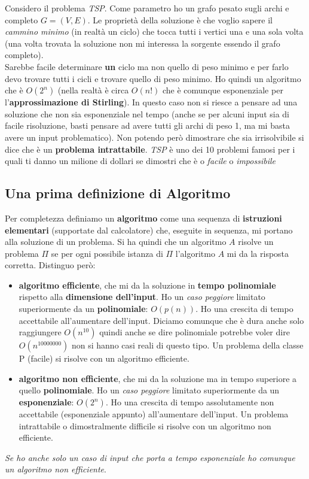 \begin{esempio}
	Considero il problema \emph{TSP}. Come parametro ho un grafo pesato sugli
	archi e completo $G=(V,E)$. Le proprietà della soluzione è che voglio sapere
	il \emph{cammino minimo} (in realtà un ciclo) che tocca tutti i vertici una e
	una sola volta (una volta trovata la soluzione non mi interessa la sorgente
	essendo il grafo completo). \\
	Sarebbe facile determinare \textbf{un} ciclo ma non quello di peso minimo e
	per farlo devo trovare tutti i cicli e trovare quello di peso minimo. Ho
	quindi un algoritmo che è $O(2^n)$ (nella realtà è circa $O(n!)$ che è
	comunque esponenziale per l'\textbf{approssimazione di Stirling}). In questo
	caso non si riesce a pensare ad una soluzione che non sia esponenziale nel
	tempo (anche se per alcuni input sia di facile risoluzione, basti pensare ad
	avere tutti gli archi di peso 1, ma mi basta avere un input problematico). Non
	potendo però dimostrare che sia irrisolvibile si dice che è un
	\textbf{problema intrattabile}. \textit{TSP} è uno dei 10 problemi famosi per
	i quali ti danno un milione di dollari se dimostri che è o \emph{facile} o
	\emph{impossibile}
\end{esempio}

\subsection{Una prima definizione di Algoritmo}
Per completezza definiamo un \textbf{algoritmo} come una sequenza di
\textbf{istruzioni elementari} (supportate dal calcolatore) che, eseguite in
sequenza, mi portano alla soluzione di un problema. Si ha quindi che un
algoritmo $A$ risolve un problema $\Pi$ se per ogni possibile istanza di $\Pi$
l'algoritmo $A$ mi da la risposta corretta. Distinguo però:
\begin{itemize}
	\item \textbf{algoritmo efficiente}, che mi da la soluzione in \textbf{tempo
	      polinomiale} rispetto alla \textbf{dimensione dell'input}. Ho un
	\textit{caso peggiore} limitato superiormente da un \textbf{polinomiale}:
	$O(p(n))$. Ho una crescita di tempo accettabile all'aumentare
	dell'input. Diciamo comunque che è dura anche solo raggiungere $O(n^{10})$
	quindi anche se dire polinomiale potrebbe voler dire $O(n^{10000000})$ non si
	hanno casi reali di questo tipo. Un problema della classe P (facile) si risolve con un algoritmo efficiente.
		  
	\item \textbf{algoritmo non efficiente}, che mi da la soluzione ma in tempo
	      superiore a quello \textbf{polinomiale}. Ho un \textit{caso peggiore} limitato
	      superiormente da un \textbf{esponenziale}: $O(2^n)$. Ho una crescita di tempo
	      assolutamente non accettabile (esponenziale appunto) all'aumentare dell'input. Un problema intrattabile o dimostralmente difficile si risolve con un algoritmo non efficiente.
\end{itemize}
\textit{Se ho anche solo un caso di input che porta a tempo esponenziale ho
	comunque un algoritmo non efficiente}.\\

